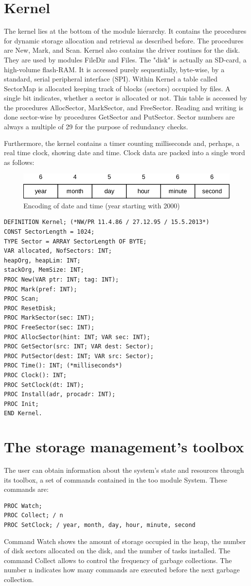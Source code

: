 \section{Kernel}
The kernel lies at the bottom of the module hierarchy. It contains the procedures for dynamic
storage allocation and retrieval as described before. The procedures are New, Mark, and Scan.
Kernel also contains the driver routines for the disk. They are used by modules FileDir and Files.
The "disk" is actually an SD-card, a high-volume flash-RAM. It is accessed purely sequentially,
byte-wise, by a standard, serial peripheral interface (SPI). Within Kernel a table called SectorMap is
allocated keeping track of blocks (sectors) occupied by files. A single bit indicates, whether a sector
is allocated or not. This table is accessed by the procedures AllocSector, MarkSector, and
FreeSector. Reading and writing is done sector-wise by procedures GetSector and PutSector.
Sector numbers are always a multiple of 29 for the purpose of redundancy checks.

Furthermore, the kernel contains a timer counting milliseconds and, perhaps, a real time clock,
showing date and time. Clock data are packed into a single word as follows:
\begin{figure}
	\label{fig:datetime}
	\centering
	\includegraphics[width=\textwidth]{i/y}
	\caption{Encoding of date and time (year starting with 2000)}
\end{figure}
\begin{verbatim}
DEFINITION Kernel; (*NW/PR 11.4.86 / 27.12.95 / 15.5.2013*)
CONST SectorLength = 1024;
TYPE Sector = ARRAY SectorLength OF BYTE;
VAR allocated, NofSectors: INT;
heapOrg, heapLim: INT;
stackOrg, MemSize: INT;
PROC New(VAR ptr: INT; tag: INT);
PROC Mark(pref: INT);
PROC Scan;
PROC ResetDisk;
PROC MarkSector(sec: INT);
PROC FreeSector(sec: INT);
PROC AllocSector(hint: INT; VAR sec: INT);
PROC GetSector(src: INT; VAR dest: Sector);
PROC PutSector(dest: INT; VAR src: Sector);
PROC Time(): INT; (*milliseconds*)
PROC Clock(): INT;
PROC SetClock(dt: INT);
PROC Install(adr, procadr: INT);
PROC Init;
END Kernel.
\end{verbatim}

\section{The storage management's toolbox}
The user can obtain information about the system's state and resources through its toolbox, a set of
commands contained in the too module System. These commands are:
\begin{verbatim}
PROC Watch;
PROC Collect; / n
PROC SetClock; / year, month, day, hour, minute, second
\end{verbatim}

Command Watch shows the amount of storage occupied in the heap, the number of disk sectors
allocated on the disk, and the number of tasks installed. The command Collect allows to control the
frequency of garbage collections. The number n indicates how many commands are executed
before the next garbage collection.
